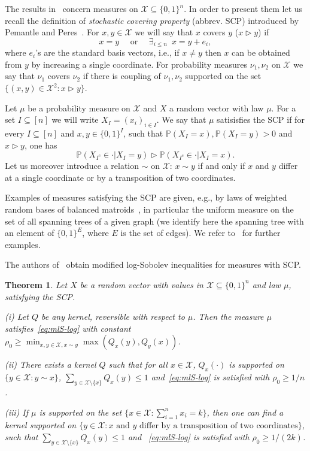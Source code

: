 \documentclass[a4paper]{amsart}
\newtheorem{theorem}{Theorem}[section]
\theoremstyle{definition}
\theoremstyle{remark}
\numberwithin{equation}{section}
\newcommand{\calX}{\mathcal{X}}
\newcommand*{\PP}{\mathbb{P}} %
\begin{document}
The results in~\cite{hermon2019modified} concern measures on $\mathcal{X} \subseteq \{0,1\}^n$. In order to present them let us recall the definition of \emph{stochastic covering property} (abbrev. SCP) introduced by Pemantle and Peres~\cite{MR3197973}. For $x,y \in \calX$ we will say that $x$ covers $y$ ($x \rhd y$) if
\begin{displaymath}
  x = y \quad \text{ or } \quad \exists_{i \le n} \enspace x = y + e_i,
\end{displaymath}
where $e_i$'s are the standard basis vectors, i.e., if $x\neq y$ then $x$ can be obtained from $y$ by increasing a single coordinate. For probability measures $\nu_1, \nu_2$ on $\mathcal{X}$ we say that $\nu_1$ covers $\nu_2$ if there is  coupling of $\nu_1,\nu_2$ supported on the set $\{(x,y) \in \calX^2\colon x\rhd y\}$.

Let $\mu$ be a probability measure on $\calX$ and $X$ a random vector with law $\mu$. For a set $I \subseteq [n]$ we will write $X_I = (x_i)_{i\in I}$. We say that $\mu$ satisisfies the SCP if for every $I \subseteq [n]$ and $x,y \in \{0,1\}^I$, such that $\PP(X_I = x), \PP(X_I = y) > 0$ and $x \rhd y$,
one has
\begin{displaymath}
  \PP(X_{I^c}\in \cdot | X_I = y) \rhd \PP(X_{I^c}\in \cdot | X_I = x).
\end{displaymath}
Let us moreover introduce a relation $\sim$ on $\mathcal{X}$:
$x\sim y$ if and only if $x$ and $y$ differ at a single coordinate or by a transposition of two coordinates.


Examples of measures satisfying the SCP are given, e.g., by laws of weighted random bases of balanced matroids~\cite{FederMihail}, in particular the uniform measure on the set of all spanning trees of a given graph (we identify here the spanning tree with an element of $\{0,1\}^E$, where $E$ is the set of edges). We refer to~\cite{MR3197973} for further examples.

The authors of~\cite{hermon2019modified} obtain modified log-Sobolev inequalities for measures with SCP.

\begin{theorem} \label{prop:SCP}
Let $X$ be a random vector with values in $\calX \subseteq \{0,1\}^n$ and law $\mu$, satisfying the SCP.

(i)
 Let $Q$ be any kernel, reversible with respect to $\mu$. Then the measure $\mu$ satisfies~\eqref{eq:mlS-log} with constant $\rho_0 \ge \min_{x,y\in\calX, x\sim y}\max(Q_x(y),Q_y(x))$.

(ii)
There exists a kernel $Q$ such that for all $x\in \mathcal{X}$, $Q_x(\cdot)$ is supported on $\{y\in \calX\colon y\sim x\}$, $\sum_{y\in \calX\setminus\{x\}} Q_x(y) \le 1$ and~\eqref{eq:mlS-log} is satisfied with $\rho_0 \ge 1/n$.

(iii)
If $\mu$ is supported on the set $\{x\in\calX\colon \sum_{i=1}^n x_i = k\}$, then one can find a kernel supported on $\{y\in\calX\colon \textrm{$x$ and $y$ differ by a transposition of two coordinates}\}$, such that $\sum_{y\in \calX\setminus\{x\}} Q_x(y) \le 1$ and ~\eqref{eq:mlS-log} is satisfied with $\rho_0 \ge 1/(2k)$.
\end{theorem}
\end{document}
